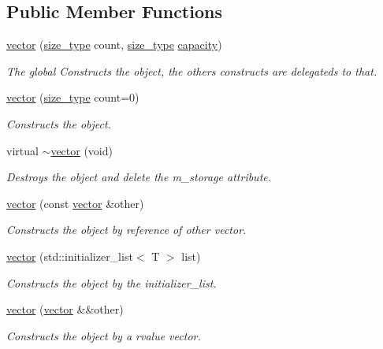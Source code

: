 \subsection*{Public Member Functions}
\begin{DoxyCompactItemize}
\item 
\hyperlink{classvector_a1768201f56ea3b2e820c191be85c2f79}{vector} (\hyperlink{classvector_a4d06f3ade0c2ac023b7a7edb85d9d1ef}{size\+\_\+type} count, \hyperlink{classvector_a4d06f3ade0c2ac023b7a7edb85d9d1ef}{size\+\_\+type} \hyperlink{classvector_a07f59d5072ec6ce9a895bb25e730871d}{capacity})
\begin{DoxyCompactList}\small\item\em The global Constructs the object, the others constructs are delegateds to that. \end{DoxyCompactList}\item 
\hyperlink{classvector_aebcae442c842116e05ecd7ea203ad25e}{vector} (\hyperlink{classvector_a4d06f3ade0c2ac023b7a7edb85d9d1ef}{size\+\_\+type} count=0)
\begin{DoxyCompactList}\small\item\em Constructs the object. \end{DoxyCompactList}\item 
virtual \hyperlink{classvector_a260a8b82458c2ce9233d1f5cb9c82e4a}{$\sim$vector} (void)
\begin{DoxyCompactList}\small\item\em Destroys the object and delete the m\+\_\+storage attribute. \end{DoxyCompactList}\item 
\hyperlink{classvector_a9b9494209da81c872941f58ae482dab6}{vector} (const \hyperlink{classvector}{vector} \&other)
\begin{DoxyCompactList}\small\item\em Constructs the object by reference of other vector. \end{DoxyCompactList}\item 
\hyperlink{classvector_a0e4c03e366983edcfeab3fff1968174c}{vector} (std\+::initializer\+\_\+list$<$ T $>$ list)
\begin{DoxyCompactList}\small\item\em Constructs the object by the initializer\+\_\+list. \end{DoxyCompactList}\item 
\hyperlink{classvector_a574f3d317cdd3589fdd519c50a1cd3f8}{vector} (\hyperlink{classvector}{vector} \&\&other)
\begin{DoxyCompactList}\small\item\em Constructs the object by a rvalue vector. \end{DoxyCompactList}\item 

\end{DoxyCompactItemize}
